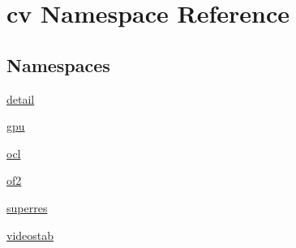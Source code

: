\hypertarget{namespacecv}{\section{cv Namespace Reference}
\label{namespacecv}
}
\subsection*{Namespaces}
\begin{DoxyCompactItemize}
\item 
\hyperlink{namespacecv_1_1detail}{detail}
\item 
\hyperlink{namespacecv_1_1gpu}{gpu}
\item 
\hyperlink{namespacecv_1_1ocl}{ocl}
\item 
\hyperlink{namespacecv_1_1of2}{of2}
\item 
\hyperlink{namespacecv_1_1superres}{superres}
\item 
\hyperlink{namespacecv_1_1videostab}{videostab}
\end{DoxyCompactItemize}

